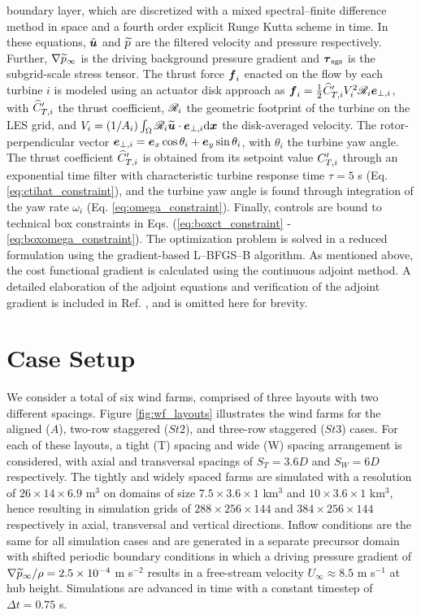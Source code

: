 \documentclass[a4paper]{jpconf}
\begin{document}
boundary layer, which are discretized with a mixed spectral--finite difference method in space and a fourth order explicit Runge Kutta scheme in time. 
In these equations, $\tilde{\boldsymbol{u}}$ and $\widetilde{p}$ are the filtered velocity and pressure respectively. Further, $\nabla \widetilde{p}_\infty$ is the driving background pressure gradient and $\boldsymbol{\tau}_{\rm sgs}$ is the subgrid-scale stress tensor. The thrust force $\boldsymbol{f}_i$ enacted on the flow by each turbine $i$ is modeled using an actuator disk approach as 
$\boldsymbol{f}_i = \frac{1}{2} \widehat{C}_{T,i}' V_i^2 \mathscr{R}_i \boldsymbol{e}_{\perp,i}$,
with $\widehat{C}_{T,i}'$ the thrust coefficient, $\mathscr{R}_i$ the geometric footprint of the turbine on the LES grid, and $V_i = (1/A_i) \int_{\Omega} \mathscr{R}_i \widetilde{\boldsymbol{u}} \cdot \boldsymbol{e}_{\perp,i} \text{d}\boldsymbol{x}$ the disk-averaged velocity. The rotor-perpendicular vector $\boldsymbol{e}_{\perp,i} = \boldsymbol{e}_x \cos \theta_i + \boldsymbol{e}_y \sin \theta_i$, with $\theta_i$ the turbine yaw angle. 
The thrust coefficient $\widehat{C}_{T,i}'$ is obtained from its setpoint value $C_{T,i}'$ through an exponential time filter with characteristic turbine response time $\tau = 5$ s (Eq. \ref{eq:ctihat_constraint}), and the turbine yaw angle is found through integration of the yaw rate $\omega_i$ (Eq. \ref{eq:omega_constraint}). Finally, controls are bound to technical box constraints in Eqs. (\ref{eq:boxct_constraint} - \ref{eq:boxomega_constraint}).
The optimization problem is solved in a reduced formulation using the gradient-based {L--BFGS--B} algorithm. As mentioned above, the cost functional gradient is calculated using the continuous adjoint method. A detailed elaboration of the adjoint equations and verification of the adjoint gradient is included in Ref. \cite{muntersenergies}, and is omitted here for brevity. %

\section{Case Setup}\label{sec:setup}
We consider a total of six wind farms, comprised of three layouts with two different spacings. Figure \ref{fig:wf_layouts} illustrates the wind farms
for the aligned ($A$), two-row staggered ($St2$), and three-row staggered ($St3$) cases. For each of these layouts, a tight (T) spacing and wide (W)
spacing arrangement is considered, with axial and transversal spacings of $S_T = 3.6D$ and $S_W = 6D$ respectively. The tightly and widely spaced
farms are simulated with a resolution of $26 \times 14 \times 6.9$ m$^3$ on domains of size $7.5 \times 3.6 \times 1$ km$^3$ and $10 \times 3.6 \times 1$ km$^3$,
hence resulting in simulation grids of $288 \times 256 \times 144$ and $384 \times 256 \times 144$ respectively in axial, transversal and vertical
directions. Inflow conditions are the same for all simulation cases and are generated in a separate precursor domain with shifted periodic boundary
conditions \cite{munterspof} in which a driving pressure gradient of $\nabla \widetilde{p}_\infty / \rho = 2.5 \times 10^{-4}$ m s$^{-2}$ results in a
free-stream velocity $U_\infty \approx 8.5 $ m s$^{-1}$ at hub height. Simulations are advanced in time with a constant timestep of $\Delta t = 0.75$ s. 
\end{document}
